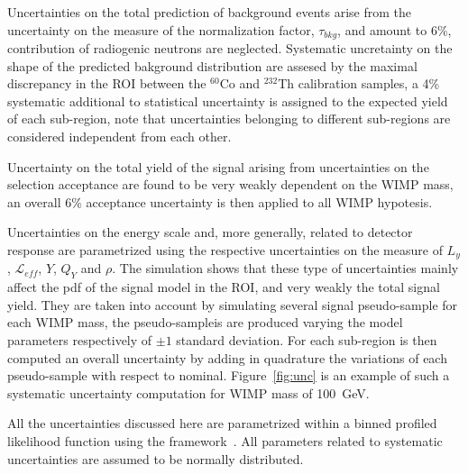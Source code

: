 Uncertainties on the total prediction of background events arise from the uncertainty on the measure of the normalization 
factor, $\tau_{bkg}$, and amount to 6\%, contribution of radiogenic neutrons are neglected. 
Systematic uncretainty on the shape of the predicted bakground distribution are assesed by the maximal discrepancy in the ROI between
the $^{60}$Co and $^{232}$Th calibration samples, a 4\% systematic additional to statistical uncertainty is assigned to the expected yield of each sub-region,
note that uncertainties belonging to different sub-regions are considered independent from each other.

Uncertainty on the total yield of the signal arising from uncertainties on the selection acceptance are found to be very weakly dependent on 
the WIMP mass, an overall 6\% acceptance uncertainty is then applied to all WIMP hypotesis. 

Uncertainties on the energy scale and, more generally, related to detector response 
are parametrized using the respective uncertainties on the measure of $L_y$, $\mathcal{L}_{eff}$, $Y$, $Q_Y$ and $\rho$. The simulation shows 
that these type of uncertainties mainly affect the pdf of the signal model in the ROI, and very weakly the total signal yield. 
They are taken into account by simulating several signal pseudo-sample for each WIMP mass, the pseudo-sampleis are produced varying the model parameters respectively of $\pm 1$ standard deviation. 
For each sub-region is then computed an overall uncertainty by adding in quadrature the variations of each pseudo-sample 
with respect to nominal. Figure~\ref{fig:unc} is an example of such a systematic uncertainty computation for WIMP mass of 100~GeV.


All the uncertainties discussed here are parametrized within a binned profiled likelihood function using the framework~\cite{roostat,roofit}.
All parameters related to systematic uncertainties are assumed to be normally distributed.


















